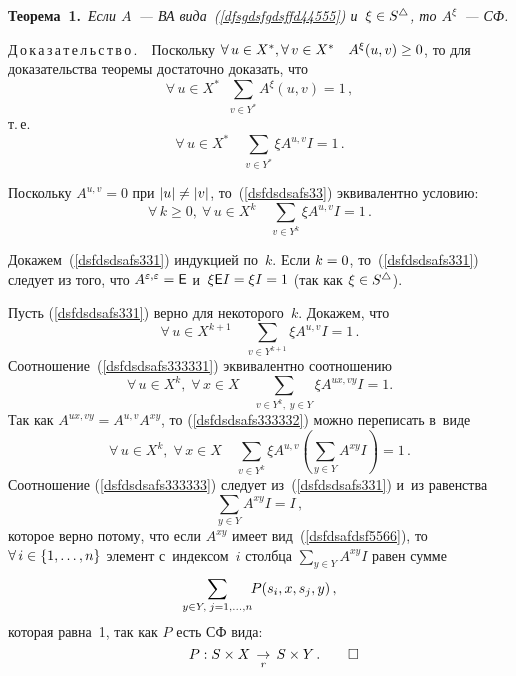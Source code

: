 \begin{multicols}{2}
\smallskip

\noindent
\textbf{Теорема~1.}\
\textit{Если $A$~---  ВА вида~(\ref{dfsgdsfgdsffd44555})
и~$\xi\hm\in S^\bullettri$, то $A^\xi$~--- СФ.}

\smallskip

\noindent
Д\,о\,к\,а\,з\,а\,т\,е\,л\,ь\,с\,т\,в\,о\,.\ \
Поскольку $\forall\,u\hm\in X^*, \forall\,v\hm\in X^*\quad A^\xi(u,v)\geq
0$, то для доказательства теоремы достаточно доказать, что
$$
\forall\,u\in X^*\;\;\sum\limits_{v\in Y^*} A^\xi(u,v)=1\,,
$$
 т.\,е.\
\begin{equation}
\label{dsfdsdsafs33}
\forall\,u\in X^*\quad\sum\limits_{v\in Y^*}\xi
A^{u,v} I=1\,.
\end{equation}

Поскольку $A^{u,v}=0$ при $|u|\hm\neq|v|$, то~(\ref{dsfdsdsafs33})
эквивалентно условию:
\begin{equation}
\label{dsfdsdsafs331}
 \forall\,k\geq 0,\ \forall\,u\in X^k\quad
\sum\limits_{v\in Y^k}\xi A^{u,v} I =1\,.
\end{equation}

Докажем~(\ref{dsfdsdsafs331}) индукцией по~$k$. Если $k\hm=0$, то~(\ref{dsfdsdsafs331})
следует из того, что
$A^{\varepsilon,\varepsilon}\hm={\sf E}$ и~$\xi {\sf E} I\hm=\xi I=1$ (так как $\xi\hm\in
S^\bullettri$).

Пусть (\ref{dsfdsdsafs331}) верно для некоторого~$k$. Докажем, что
\begin{equation}
\label{dsfdsdsafs333331}
\forall\,u\in X^{k+1}\quad \sum\limits_{v\in Y^{k+1}}\xi A^{u,v} I =1\,.
\end{equation}
Соотношение~(\ref{dsfdsdsafs333331}) эквивалентно соотношению
\begin{equation}
\label{dsfdsdsafs333332}
\forall\,u\in X^{k}, \;\forall\,x\in X\quad \sum\limits_{v\in Y^{k},\;y\in Y}\xi
A^{ux,vy} I =1.
\end{equation}
Так как $A^{ux,vy} = A^{u,v}  A^{xy}$, то
(\ref{dsfdsdsafs333332}) можно переписать в~виде
\begin{equation}
\label{dsfdsdsafs333333}
\forall\,u\in X^{k}, \;\forall\,x\in X\quad \sum\limits_{v\in
Y^{k}}\xi A^{u,v} \left(\sum\limits_{y\in Y}A^{xy}
 I\right) =1\,.
 \end{equation}
Соотношение (\ref{dsfdsdsafs333333}) следует из~(\ref{dsfdsdsafs331}) и~из равенства
\begin{equation}
\label{dsfdsdsafs333334}
\sum\limits_{y\in Y}A^{xy} I=I\,,
\end{equation}
которое
верно потому, что если $A^{xy}$ имеет вид~(\ref{dsfdsafdsf5566}), то
$\forall\,i\hm\in\{1,\ldots,n\}$ элемент с~индексом~$i$ столбца
$\sum\limits_{y\in Y}A^{xy} I$ равен сумме
$$
\sum\limits_{y\in Y,\;j=1,\ldots,n}\hspace*{-1mm}P(s_i,x,s_j,y)\,,
$$
которая равна~1, так как $P$ есть СФ вида:
$$
~~~~~~P:S\times X\;\mathop{\to}\limits_{r}\; S\times Y\,.~~~~~~\square
$$



\end{multicols}

